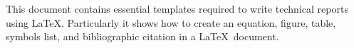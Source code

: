 \begin{Abstract}
This document contains essential templates required to write technical
reports using \LaTeX.  Particularly it shows how to create an
equation, figure, table, symbols list, and bibliographic citation in a \LaTeX\
document.
%
%
%
%
%
\end{Abstract}

